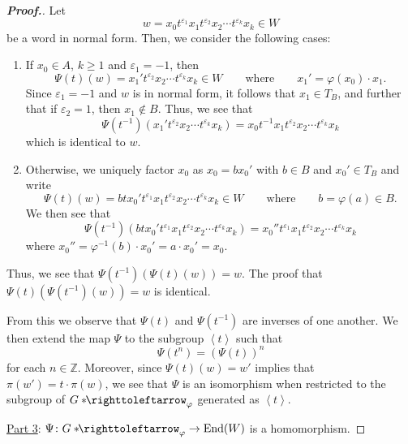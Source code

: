 \documentclass[11pt,a4paper,reqno]{amsart}
\theoremstyle{plain}
\theoremstyle{definition}
\theoremstyle{definition}
\renewcommand\geq\geqslant
\newenvironment{myproof}{\begin{proof}[\normalfont\bfseries Proof.]}{\end{proof}}
\newcommand\hnn{*\!\!\righttoleftarrow}
\begin{document}
\begin{myproof}
	Let
	\[
		w = x_0 t^{\varepsilon_1} x_1 t^{\varepsilon_2} x_2 \cdots t^{\varepsilon_k} x_k \in W
	\]
	be a word in normal form.
	Then, we consider the following cases:
	\begin{enumerate}[label=\alph*)]
		\item If $x_0 \in A$, $k\geq 1$ and $\varepsilon_1 =-1$, then
		      \[
			      \Psi(t)(w)
			      =
			      x_1' t^{\varepsilon_2} x_2 \cdots t^{\varepsilon_k} x_k \in W
			      \qquad
			      \text{where}
			      \qquad
			      x_1' = \varphi(x_0) \cdot x_1.
		      \]
		      Since $\varepsilon_1 = -1$ and $w$ is in normal form, it follows that $x_1\in T_B$, and further that if $\varepsilon_2=1$, then $x_1\notin B$.
		      Thus, we see that
		      \[
			      \Psi(t^{-1})(x_1' t^{\varepsilon_2} x_2 \cdots t^{\varepsilon_k} x_k)
			      =
			      x_0 t^{-1} x_1 t^{\varepsilon_2} x_2 \cdots t^{\varepsilon_k} x_k
		      \]
		      which is identical to $w$.

		\item Otherwise, we uniquely factor $x_0$ as $x_0 = b x_0'$ with $b\in B$ and $x_0'\in T_B$ and write
		      \[
			      \Psi(t)(w)
			      =
			      b t x_0' t^{\varepsilon_1} x_1 t^{\varepsilon_2} x_2 \cdots t^{\varepsilon_k} x_k \in W
			      \qquad
			      \text{where}
			      \qquad
			      b=\varphi(a)\in B.
		      \]
		      We then see that
		      \[
			      \Psi(t^{-1})(b t x_0' t^{\varepsilon_1} x_1 t^{\varepsilon_2} x_2 \cdots t^{\varepsilon_k} x_k)
			      =
			      x_0'' t^{\varepsilon_1} x_1 t^{\varepsilon_2} x_2 \cdots t^{\varepsilon_k} x_k
		      \]
		      where $x_0'' = \varphi^{-1}(b)\cdot x_0' = a \cdot x_0' = x_0$.
	\end{enumerate}
	Thus, we see that $\Psi(t^{-1})(\Psi(t)(w)) = w$. The proof that $\Psi(t)(\Psi(t^{-1})(w)) = w$ is identical.

	From this we observe that $\Psi(t)$ and $\Psi(t^{-1})$ are inverses of one another.
	We then extend the map $\Psi$ to the subgroup $\left\langle t \right\rangle$ such that
	\[
		\Psi(t^n) = (\Psi(t))^n
	\]
	for each $n\in \mathbb Z$.
	Moreover, since $\Psi(t)(w)=w'$ implies that $\pi(w') = t\cdot \pi(w)$, we see that $\Psi$ is an isomorphism when restricted to the subgroup of $G\hnn_\varphi$ generated as $\left\langle t \right\rangle$.

	\medskip
	\noindent
	\underline{Part 3}: $\Psi\colon G\hnn_\varphi \to \mathrm{End}(W)$ is a homomorphism.
	\nopagebreak


\end{myproof}
\end{document}
